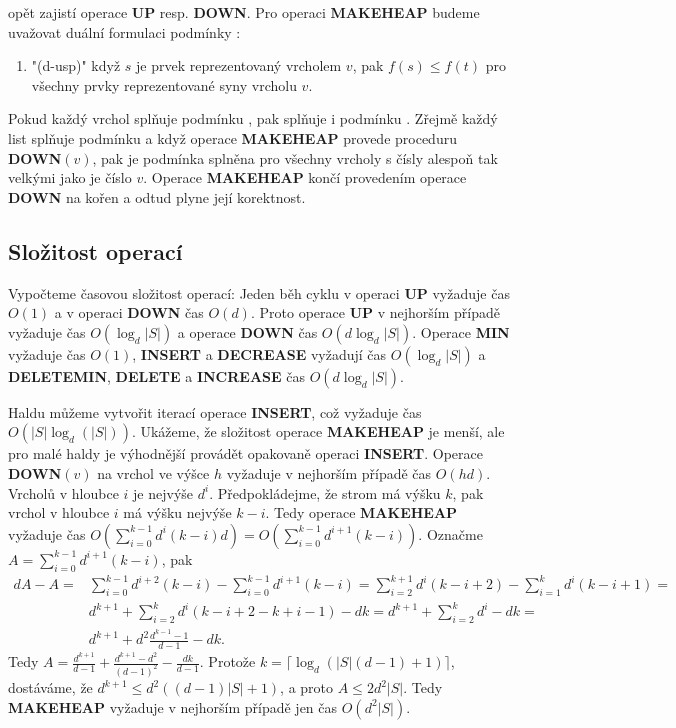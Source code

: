\documentclass[a4paper,12pt]{article}
\begin{document}
opět zajistí operace {\bf UP }
resp. {\bf DOWN}.  Pro operaci {\bf MAKEHEAP }
budeme uvažovat duální formulaci podmínky :  
\begin{enumerate}
\item"{(d-usp)}"
když $s$ je prvek reprezentovaný vrcholem $v$, pak 
$f(s)\le f(t)$ pro všechny prvky reprezentované syny 
vrcholu $v$. 
\end{enumerate}
Pokud každý vrchol splňuje podmínku , pak 
splňuje i pod\-mínku . Zřejmě každý list splňuje 
podmínku  a když ope\-race {\bf MAKEHEAP }
provede proceduru {\bf DOWN$(v)$}, pak je podmínka 
 splněna pro všechny vrcholy s 
čísly alespoň tak velkými jako je číslo $v$. 
Operace {\bf MAKEHEAP} končí provedením operace {\bf DOWN} na 
kořen a odtud plyne její korektnost.

\subsection{
Složitost operací
}

Vypočteme časovou složitost operací:  Jeden běh cyklu 
v operaci {\bf UP} vyžaduje čas $O(1)$ a v operaci {\bf DOWN }čas $
O(d)$.  
Proto operace {\bf UP} v nejhorším případě vyžaduje čas $
O(\log_d|S|)$ 
a operace {\bf DOWN }čas $O(d\log_d|S|)$.  
Operace {\bf MIN} vyžaduje čas $O(1)$,  {\bf INSERT} a {\bf DECREASE }
vyžadu\-jí čas $O(\log_d|S|)$ a  {\bf DELETEMIN}, {\bf DELETE} a 
{\bf INCREASE }čas $O(d\log_d|S|)$.

Haldu můžeme 
vytvořit iterací operace {\bf INSERT}, což 
vyžaduje čas $O(|S|\log_d(|S|))$.  Ukáže\-me, že složitost operace 
{\bf MAKEHEAP} je menší, ale pro malé haldy je výhodnější 
provádět opakovaně operaci {\bf INSERT}.  Operace {\bf DOWN$
(v)$} na vrchol 
ve výšce $h$ vyžaduje v nej\-horším případě čas $
O(hd)$.  
Vrcholů v hloubce $i$ je nejvýše $d^i$.  
Před\-pok\-lá\-dejme, že strom má výšku $k$, pak vrchol v 
hloubce $i$ má výšku nejvýše $k-i$.  Tedy operace {\bf MAKEHEAP }
vyžaduje čas $O(\sum_{i=0}^{k-1}d^i(k-i)d)=O(\sum_{i=0}^{k-
1}d^{i+1}(k-i))$.  Oz\-nač\-me 
$A=\sum_{i=0}^{k-1}d^{i+1}(k-i)$, pak 
\begin{align*} dA-A=&\sum_{i=0}^{k-1}d^{i+2}(k-i)-\sum_{i=0}^{k-1}d^{i+
1}(k-i)=\sum_{i=2}^{k+1}d^i(k-i+2)-\sum_{i=1}^kd^i(k-i+1)=\\
&d^{k+1}+\sum_{i=2}^kd^i(k-i+2-k+i-1)-dk=d^{k+1}+\sum_{i=2}^kd^i-
dk=\\
&d^{k+1}+d^2\frac {d^{k-1}-1}{d-1}-dk.\end{align*}
Tedy $A=\frac {d^{k+1}}{d-1}+\frac {d^{k+1}-d^2}{(d-1)^2}-\frac {
dk}{d-1}$. Protože 
$k=\lceil\log_d(|S|(d-1)+1)\rceil$, 
dostáváme, že $d^{k+1}\le d^2((d-1)|S|+1)$, a proto $A\le 
2d^2|S|$. Tedy 
{\bf MAKEHEAP} vyžaduje v nejhorším případě jen čas 
$O(d^2|S|)$. 
\end{document}
